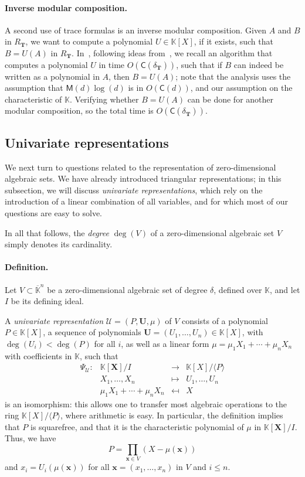 \documentclass[12pt]{article}
\def\CC {\ensuremath{\mathsf{C}}}
\def\K {\ensuremath{\mathbb{K}}}
\def\Kbar {\ensuremath{\overline{\mathbb{K}}}}
\def\M {\ensuremath{\mathsf{M}}}
\def\Tt {\ensuremath{\mathbf{T}}}
\def\Uu {\ensuremath{\mathbf{U}}}
\def\x {\ensuremath{\mathbf{x}}}
\def\X {\ensuremath{\mathbf{X}}}
\def\Ur {\ensuremath{\mathscr U}}
\begin{document}
\paragraph{Inverse modular composition.}
A second use of trace formulas is an inverse modular
composition. Given $A$ and $B$ in $R_\Tt$, we want to compute a
polynomial $U \in \K[X]$, if it exists, such that $B=U(A)$ in
$R_\Tt$. In~\cite{PoSc10}, following ideas
from~\cite{Shoup94,Rouillier99}, we recall an algorithm that computes
a polynomial $U$ in time $O(\CC(\delta_\Tt))$, such that if $B$ can
indeed be written as a polynomial in $A$, then $B=U(A)$; note that the
analysis uses the assumption that $\M(d)\log(d)$ is in $O(\CC(d))$,
and our assumption on the characteristic of $\K$. Verifying whether
$B=U(A)$ can be done for another modular composition, so the total
time is $O(\CC(\delta_\Tt)).$



\subsection{Univariate representations}\label{ssec:uni}

We next turn to questions related to the representation of
zero-dimensional algebraic sets. We have already introduced triangular
representations; in this subsection, we will discuss {\em univariate
  representations}, which rely on the introduction of a linear
combination of all variables, and for which most of our questions are
easy to solve.

In all that follows, the {\em degree} $\deg(V)$ of a zero-dimensional
algebraic set $V$ simply denotes its cardinality.

\paragraph{Definition.}
Let $V\subset \Kbar^n$ be a zero-dimensional algebraic set of degree
$\delta$, defined over $\K$, and let $I$ be its defining ideal.

A {\em univariate representation} $\Ur=(P,\Uu,\mu)$ of $V$ consists of
a polynomial $P\in\K[X]$, a sequence of polynomials
$\Uu=(U_1,\dots,U_n) \in \K[X]$, with $\deg(U_i) < \deg(P)$ for all
$i$, as well as a linear form $\mu=\mu_1 X_1 + \cdots+ \mu_n X_n$ with
coefficients in $\K$, such that
\begin{equation}\label{eq:psi}
  \begin{array}{cccc}
    \Psi_\Ur:&\K[\X]/I& \to & \K[X]/\langle P\rangle \\
    &X_1,\dots,X_n & \mapsto & U_1,\dots,U_n\\
    &\mu_1 X_1 + \cdots + \mu_n X_n & \mapsfrom & X
  \end{array}
\end{equation}
is an isomorphism: this allows one to transfer most algebraic
operations to the ring $\K[X]/\langle P\rangle$, where arithmetic is
easy. In particular, the definition implies that $P$ is squarefree,
and that it is the characteristic polynomial of $\mu$ in $\K[\X]/I$.
Thus, we have
$$P=\prod_{\x \in V}(X-\mu(\x))$$
and $x_i=U_i(\mu(\x))$ for all $\x=(x_1,\dots,x_n)$ in $V$ and $i \le
n$.
\end{document}
